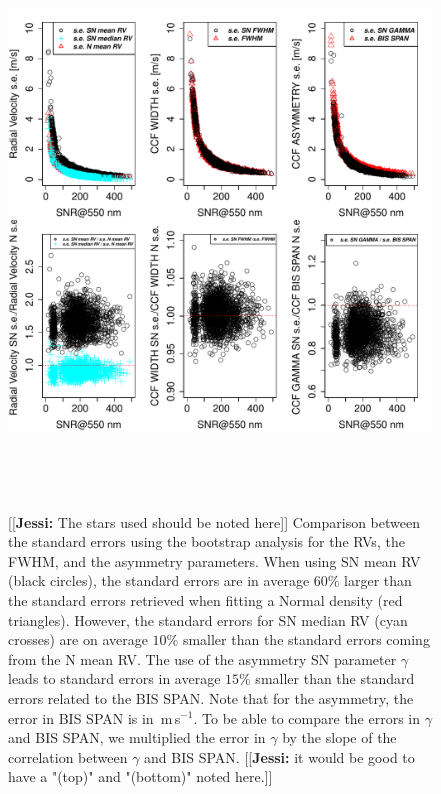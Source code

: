 \documentclass{aa}
\def\ms{\hbox{\,m\,s$^{-1}$}}         %
\newcommand{\jessi}[1]{{\color{Purple}[[\textbf{Jessi: }#1]]}}
\begin{document}
\begin{figure}[htbp]
\begin{center}
\includegraphics[height = 6in]{[5]Errors_vs_SNR_all_stars.pdf} 
   \caption{\jessi{The stars used should be noted here}  Comparison between the standard errors using the bootstrap analysis for the RVs, the FWHM, and the asymmetry parameters. When using SN mean RV (black circles), the standard errors are in average $60\%$ larger than the standard errors retrieved when fitting a Normal density (red triangles). However, the standard errors for SN median RV (cyan crosses) are on average $10\%$ smaller than the standard errors coming from the N mean RV. The use of the asymmetry SN parameter $\gamma$ leads to standard errors in average $15\%$ smaller than the standard errors related to the BIS SPAN. Note that for the asymmetry, the error in BIS SPAN is in \ms. To be able to compare the errors in $\gamma$ and BIS SPAN, we multiplied the error in $\gamma$ by the slope of the correlation between $\gamma$ and BIS SPAN. \jessi{it would be good to have a "(top)" and "(bottom)" noted here.}}
   \label{fig:se}
\end{center}
\end{figure}
\end{document}
